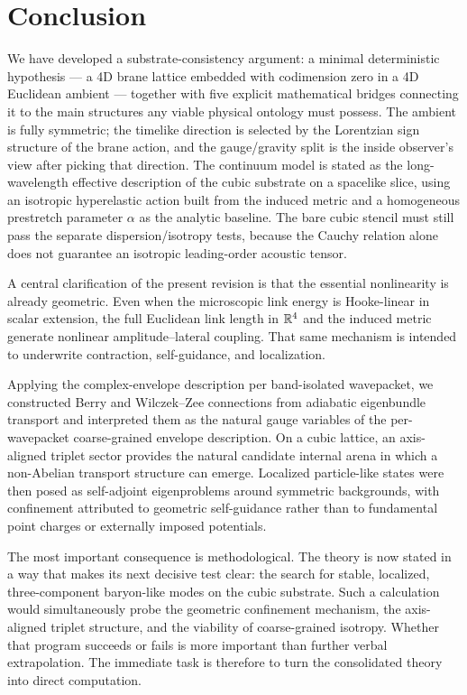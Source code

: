 \section{Conclusion}
\label{sec:conclusion}

We have developed a substrate-consistency argument: a minimal deterministic hypothesis --- a 4D brane lattice embedded with codimension zero in a 4D Euclidean ambient --- together with five explicit mathematical bridges connecting it to the main structures any viable physical ontology must possess.
The ambient is fully symmetric; the timelike direction is selected by the Lorentzian sign structure of the brane action, and the gauge/gravity split is the inside observer's view after picking that direction.
The continuum model is stated as the long-wavelength effective description of the cubic substrate on a spacelike slice, using an isotropic
hyperelastic action built from the induced metric and a homogeneous prestretch parameter $\alpha$ as the analytic
baseline. The bare cubic stencil must still pass the separate dispersion/isotropy tests, because the Cauchy relation
alone does not guarantee an isotropic leading-order acoustic tensor.

A central clarification of the present revision is that the essential nonlinearity is already geometric.
Even when the microscopic link energy is Hooke-linear in scalar extension, the full Euclidean link length in $\mathbb{R}^4$
and the induced metric generate nonlinear amplitude--lateral coupling.
That same mechanism is intended to underwrite contraction, self-guidance, and localization.

Applying the complex-envelope description per band-isolated wavepacket, we constructed Berry and Wilczek--Zee
connections from adiabatic eigenbundle transport and interpreted them as the natural gauge variables of the
per-wavepacket coarse-grained envelope description.
On a cubic lattice, an axis-aligned triplet sector provides the natural candidate internal arena in which a non-Abelian
transport structure can emerge.
Localized particle-like states were then posed as self-adjoint eigenproblems around symmetric backgrounds, with
confinement attributed to geometric self-guidance rather than to fundamental point charges or externally imposed
potentials.

The most important consequence is methodological.
The theory is now stated in a way that makes its next decisive test clear: the search for stable, localized,
three-component baryon-like modes on the cubic substrate.
Such a calculation would simultaneously probe the geometric confinement mechanism, the axis-aligned triplet structure,
and the viability of coarse-grained isotropy.
Whether that program succeeds or fails is more important than further verbal extrapolation.
The immediate task is therefore to turn the consolidated theory into direct computation.

